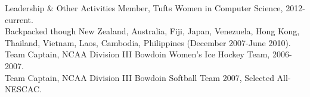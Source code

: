 \documentclass{resume} %
\begin{document}

\begin{rSection}{Leadership \& Other Activities}
Member, Tufts Women in Computer Science, 2012-current. \\
Backpacked though New Zealand, Australia, Fiji, Japan, Venezuela, Hong Kong, Thailand, Vietnam, Laos, Cambodia, Philippines (December 2007-June 2010). \\
Team Captain, NCAA Division III Bowdoin Women's Ice Hockey Team, 2006-2007.\\
Team Captain, NCAA Division III Bowdoin Softball Team 2007, Selected All-NESCAC.\\
\end{rSection}








\end{document}
